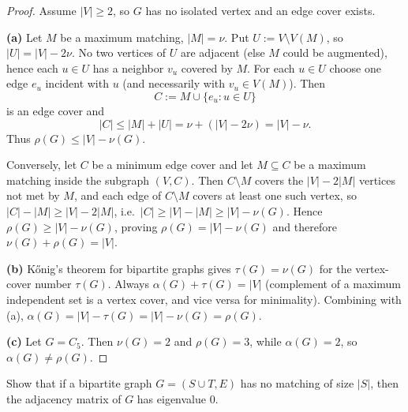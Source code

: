 \documentclass[11pt, a4paper]{ctexrep}
\begin{document}
\begin{proof}
    Assume $|V|\ge 2$, so $G$ has no isolated vertex and an edge cover exists.

    \noindent\textbf{(a)}
    Let $M$ be a maximum matching, $|M|=\nu$.
    Put $U:=V\setminus V(M)$, so $|U|=|V|-2\nu$.
    No two vertices of $U$ are adjacent (else $M$ could be augmented), hence each $u\in U$ has a neighbor $v_u$ covered by $M$.
    For each $u\in U$ choose one edge $e_u$ incident with $u$ (and necessarily with $v_u\in V(M)$).
    Then
    \[
        C:=M\cup\{e_u:u\in U\}
    \]
    is an edge cover and
    \[
        |C|\le |M|+|U|=\nu+(|V|-2\nu)=|V|-\nu.
    \]
    Thus $\rho(G)\le |V|-\nu(G)$.

    Conversely, let $C$ be a minimum edge cover and let $M\subseteq C$ be a maximum matching inside the subgraph $(V,C)$.
    Then $C\setminus M$ covers the $|V|-2|M|$ vertices not met by $M$, and each edge of $C\setminus M$ covers at least one such vertex, so
    $|C|-|M|\ge |V|-2|M|$, i.e.\ $|C|\ge |V|-|M|\ge |V|-\nu(G)$.
    Hence $\rho(G)\ge |V|-\nu(G)$, proving $\rho(G)=|V|-\nu(G)$ and therefore $\nu(G)+\rho(G)=|V|$.

    \noindent\textbf{(b)}
    K\H{o}nig's theorem for bipartite graphs gives $\tau(G)=\nu(G)$ for the vertex-cover number $\tau(G)$.
    Always $\alpha(G)+\tau(G)=|V|$ (complement of a maximum independent set is a vertex cover, and vice versa for minimality).
    Combining with \textup{(a)}, $\alpha(G)=|V|-\tau(G)=|V|-\nu(G)=\rho(G)$.

    \noindent\textbf{(c)}
    Let $G=C_5$. Then $\nu(G)=2$ and $\rho(G)=3$, while $\alpha(G)=2$, so $\alpha(G)\neq\rho(G)$.
\end{proof}

\begin{exercise}
    Show that if a bipartite graph $G=(S\cup T,E)$ has no matching of size $|S|$, then the adjacency matrix of $G$ has eigenvalue $0$.
\end{exercise}
\end{document}
